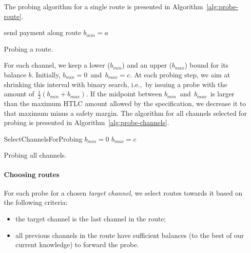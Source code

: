 The probing algorithm for a single route is presented in Algorithm~\ref{alg:probe-route}.

\begin{algorithm}
	send payment along route\;
	 {
		$b_{min} = a$\;
	}
	\caption{Probing a route.}
	\label{alg:probe-route}
\end{algorithm}

For each channel, we keep a lower ($b_{min}$) and an upper ($b_{max}$) bound for its balance $b$.
Initially, $b_{min}=0$~and~$b_{max}=c$.
At each probing step, we aim at shrinking this interval with binary search, i.e.,~by issuing a probe with the amount of~$\frac{1}{2} (b_{min} + b_{max})$.
If the midpoint between $b_{min}$~and~$b_{max}$~is larger than the maximum HTLC amount allowed by the specification, we decrease it to that maximum minus a safety margin.
The algorithm for all channels selected for probing is presented in Algorithm~\ref{alg:probe-channels}.

\begin{algorithm}
	SelectChannelsForProbing\;
	 {	
		$b_{min} = 0$\;
		$b_{max} = c$\;
		 {
		}
	}
	\caption{Probing all channels.}
	\label{alg:probe-channels}
\end{algorithm}


\paragraph{Choosing routes}

For each probe for a chosen \textit{target channel}, we select routes towards it based on the following criteria:
\begin{itemize}
	\item the target channel is the last channel in the route;
	\item all previous channels in the route have sufficient balances (to the best of our current knowledge) to forward the probe.
\end{itemize}

